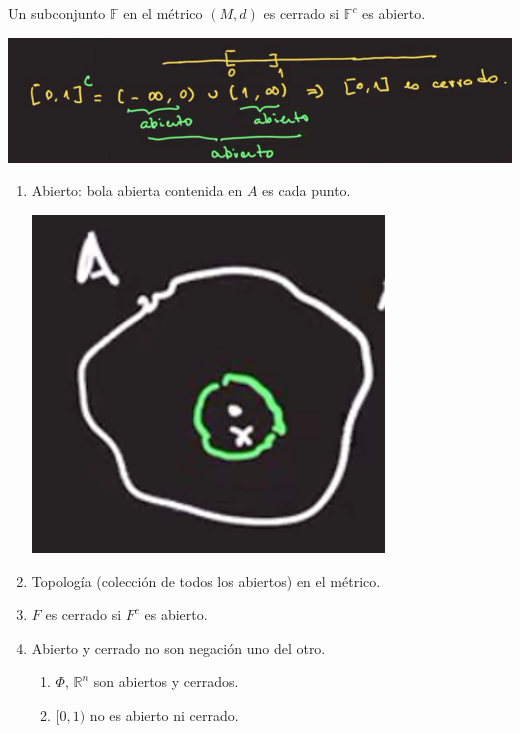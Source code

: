 \begin{definicion}
	Un subconjunto $\mathbb{F}$ en el métrico $(M,d)$ es cerrado si $\mathbb{F}^c$ es abierto. 
\end{definicion}
\begin{center}
	\includegraphics[scale=0.4]{images/2/6}
\end{center}

\begin{cajita}
	\begin{enumerate}
		\item Abierto: bola abierta contenida en $A$ es cada punto. 
		\begin{center}
			\includegraphics[scale=0.3]{images/2/7}
		\end{center}
	\item Topología (colección de todos los abiertos) en el métrico. 
	\item $F$ es cerrado si $F^c$ es abierto. 
	\item Abierto y cerrado no son negación uno del otro. \begin{enumerate}
		\item $\Phi$, $\mathbb{R}^n$ son abiertos y cerrados. 
		\item $[0,1)$ no es abierto ni cerrado. 
	\end{enumerate}
	\end{enumerate}
\end{cajita}

